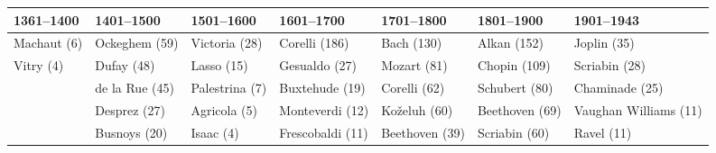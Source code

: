 \begin{tabular}{lllllll}
\toprule
 1361--1400 &     1401--1500 &     1501--1600 &       1601--1700 &     1701--1800 &     1801--1900 &            1901--1943 \\
\midrule
Machaut (6) &  Ockeghem (59) &  Victoria (28) &    Corelli (186) &     Bach (130) &    Alkan (152) &           Joplin (35) \\
  Vitry (4) &     Dufay (48) &     Lasso (15) &    Gesualdo (27) &    Mozart (81) &   Chopin (109) &         Scriabin (28) \\
            & de la Rue (45) & Palestrina (7) &   Buxtehude (19) &   Corelli (62) &  Schubert (80) &        Chaminade (25) \\
            &   Desprez (27) &   Agricola (5) &  Monteverdi (12) &   Koželuh (60) & Beethoven (69) & Vaughan Williams (11) \\
            &   Busnoys (20) &      Isaac (4) & Frescobaldi (11) & Beethoven (39) &  Scriabin (60) &            Ravel (11) \\
\bottomrule
\end{tabular}
